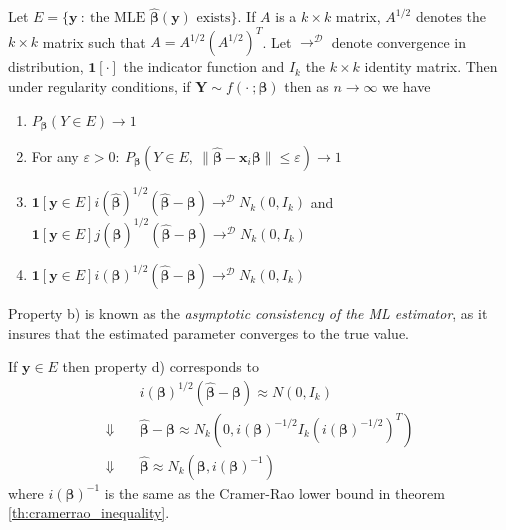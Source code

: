 \begin{theorem}\label{th:distribution_ml_estimator}
Let $E = \{\mathbf{y} \ : \ \text{the MLE } \hat{\boldsymbol{\beta}}(\mathbf{y}) \text{ exists}\}$. 
If $A$ is a $k \times k$ matrix, $A^{1/2}$ denotes the $k \times k$ matrix such that $A = A^{1/2}\left( A^{1/2} \right)^T$.
Let $\rightarrow^\mathcal{D}$ denote convergence in distribution, $\mathbf{1}[\cdot]$ the indicator function and $I_k$ the $k \times k$ identity matrix.
Then under regularity conditions, if $\mathbf{Y} \sim f(\cdot \ ;\boldsymbol{\beta})$ then as $n \rightarrow \infty$ we have 
\begin{enumerate}[label=(\alph*)]
    \item $P_{\boldsymbol{\beta}}(Y \in E) \rightarrow 1$
    \item For any $\varepsilon > 0: \ P_{\boldsymbol{\beta}}(Y \in E, \ \|\hat{\boldsymbol{\beta}} - \textbf{x}_i\boldsymbol{\beta}\| \leq \varepsilon) \rightarrow 1$
    \item $\mathbf{1}[\mathbf{y} \in E] i(\hat{\boldsymbol{\beta}})^{1/2}(\hat{\boldsymbol{\beta}} - \boldsymbol{\beta}) \rightarrow^\mathcal{D} N_k(0, I_k)$ and $\textbf{1}[\mathbf{y} \in E] j(\hat{\boldsymbol{\beta}})^{1/2}(\hat{\boldsymbol{\beta}} - \boldsymbol{\beta}) \rightarrow^\mathcal{D} N_k(0, I_k)$
    \item $\textbf{1}[\mathbf{y} \in E] i(\boldsymbol{\beta})^{1/2}(\hat{\boldsymbol{\beta}} - \boldsymbol{\beta}) \rightarrow^\mathcal{D} N_k(0, I_k)$
\end{enumerate}
\end{theorem}

Property b) is known as the \textit{asymptotic consistency of the ML estimator}, as it insures that the estimated parameter converges to the true value.

If $\textbf{y}\in E$ then property d) corresponds to
\begin{align*}
    & i(\boldsymbol{\beta})^{1/2} (\hat{\boldsymbol{\beta}}-\boldsymbol{\beta}) \approx N(0,I_k) \\
    \Downarrow \quad & \hat{\boldsymbol{\beta}}-\boldsymbol{\beta} \approx N_k(0,i(\boldsymbol{\beta})^{-1/2} I_k (i(\boldsymbol{\beta})^{-1/2})^T) \\
    \Downarrow \quad & \hat{\boldsymbol{\beta}} \approx N_k(\boldsymbol{\beta}, i(\boldsymbol{\beta})^{-1})
\end{align*}
where $i(\boldsymbol{\beta})^{-1}$ is the same as the Cramer-Rao lower bound in theorem \ref{th:cramerrao_inequality}.

